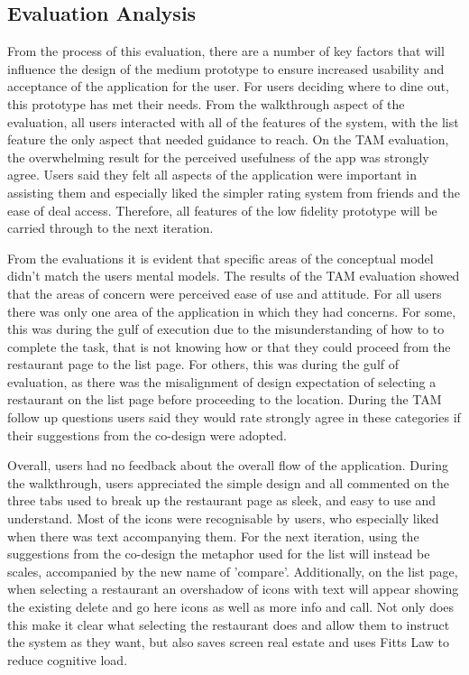 \documentclass[a4 paper, 12pt]{article}
\begin{document}
\subsection{Evaluation Analysis}
From the process of this evaluation, there are a number of key factors that will influence the design of the medium prototype to ensure increased usability and acceptance of the application for the user. For users deciding where to dine out, this prototype has met their needs. From the walkthrough aspect of the evaluation, all users interacted with all of the features of the system, with the list feature the only aspect that needed guidance to reach. On the TAM evaluation, the overwhelming result for the perceived usefulness of the app was strongly agree. Users said they felt all aspects of the application were important in assisting them and especially liked the simpler rating system from friends and the ease of deal access. Therefore, all features of the low fidelity prototype will be carried through to the next iteration.

From the evaluations it is evident that specific areas of the conceptual model didn't match the users mental models. The results of the TAM evaluation showed that the areas of concern were perceived ease of use and attitude. For all users there was only one area of the application in which they had concerns. For some, this was during the gulf of execution due to the misunderstanding of how to to complete the task, that is not knowing how or that they could proceed from the restaurant page to the list page. For others, this was during the gulf of evaluation, as there was the misalignment of design expectation of selecting a restaurant on the list page before proceeding to the location. During the TAM follow up questions users said they would rate strongly agree in these categories if their suggestions from the co-design were adopted. 

Overall, users had no feedback about the overall flow of the application. During the walkthrough, users appreciated the simple design and all commented on the three tabs used to break up the restaurant page as sleek, and easy to use and understand. Most of the icons were recognisable by users, who especially liked when there was text accompanying them. For the next iteration, using the suggestions from the co-design the metaphor used for the list will instead be scales, accompanied by the new name of 'compare'. Additionally, on the list page, when selecting a restaurant an overshadow of icons with text will appear showing the existing delete and go here icons as well as more info and call. Not only does this make it clear what selecting the restaurant does and allow them to instruct the system as they want, but also saves screen real estate and uses Fitts Law to reduce cognitive load.  
\end{document}
